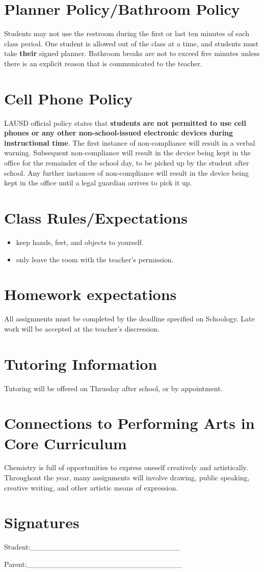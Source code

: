 \documentclass[11pt]{article}
\begin{document}
\section{Planner Policy/Bathroom Policy}
\label{sec:org531b96e}
Students may not use the restroom during the first or last ten minutes of each class period. One student is allowed out of the class at a time, and students must take \textbf{\textbf{their}} signed planner. Bathroom breaks are not to exceed five minutes unless there is an explicit reason that is communicated to the teacher.
\section{Cell Phone Policy}
\label{sec:org0107af7}
LAUSD official policy states that \textbf{\textbf{students are not permitted to use cell phones or any other non-school-issued electronic devices during instructional time}}. The first instance of non-compliance will result in a verbal warning. Subsequent non-compliance will result in  the device being kept in the office for the remainder of the school day, to be picked up by the student after school. Any further instances of non-compliance will result in the device being kept in the office until a legal guardian arrives to pick it up.
\section{Class Rules/Expectations}
\label{sec:orgb10e3ee}
\begin{itemize}
\item keep hands, feet, and objects to yourself.
\item only leave the room with the teacher's permission.
\end{itemize}
\section{Homework expectations}
\label{sec:org4eb55e9}
All assignments must be completed by the deadline specified on Schoology. Late work will be accepted at the teacher's discression. 
\section{Tutoring Information}
\label{sec:org0911ac5}
Tutoring will be offered on Thrusday after school, or by appointment.
\section{Connections to Performing Arts in Core Curriculum}
\label{sec:org85f6e59}
Chemistry is full of opportunities to express oneself creatively and artistically. Throughout the year, many assignments will involve drawing, public speaking, creative writing, and other artistic means of expression.

\section{Signatures}
\label{sec:org50fb246}

Student:\_\_\_\_\_\_\_\_\_\_\_\_\_\_\_\_\_\_\_\_\_\_\_\_\_\_\_\_


Parent:\_\_\_\_\_\_\_\_\_\_\_\_\_\_\_\_\_\_\_\_\_\_\_\_\_\_\_\_\_
\end{document}
